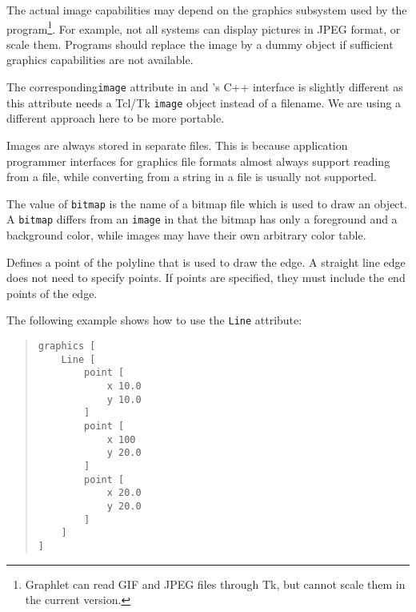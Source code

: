 \begin{GMLAttributes}
  \begin{notes}
    
    \item The actual image capabilities may depend on the
    graphics subsystem used by the program\footnote{Graphlet can
      read GIF and JPEG files through Tk, but cannot scale
      them in the current version.}. For example, not
    all systems can display pictures in JPEG format, or scale
    them.  Programs should replace the image by a dummy object if
    sufficient graphics capabilities are not available.
    
    \item The corresponding\texttt{image} attribute in
    \GraphScript{} and \GraphScript's C++ interface is slightly
    different as this attribute needs a Tcl/Tk \texttt{image}
    object instead of a filename. We are using a different
    approach here to be more portable.
    
    \item Images are always stored in separate files. This is
    because application programmer interfaces for graphics file
    formats almost always support reading from a file, while
    converting from a string in a file is usually not supported.

  \end{notes}
  
   The value of \texttt{bitmap} is
  the name of a bitmap file which is used to draw an object. A
  \texttt{bitmap} differs from an \texttt{image} in that the
  bitmap has only a foreground and a background color, while
  images may have their own arbitrary color table.
  
   Defines a point of the
  polyline that is used to draw the edge.  A straight line edge
  does not need to specify points. If points are specified, they
  must include the end points of the edge.
  
  The following example shows how to use the \texttt{Line}
  attribute:
  \begin{quote}
    \begin{small}
\begin{verbatim}
graphics [
    Line [
        point [
            x 10.0
            y 10.0
        ]
        point [
            x 100
            y 20.0
        ]
        point [
            x 20.0
            y 20.0
        ]
    ]
]
\end{verbatim}
    \end{small}
  \end{quote}
  

\end{GMLAttributes}
